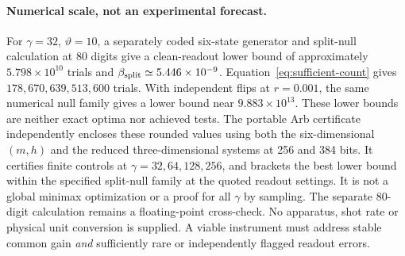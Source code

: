 \paragraph{Numerical scale, not an experimental forecast.}
For $\gamma=32$, $\vartheta=10$, a separately coded six-state generator
and split-null calculation at 80 digits give a clean-readout lower bound
of approximately $5.798\times10^{10}$ trials and
$\beta_{\rm split}\simeq5.446\times10^{-9}$. Equation~\eqref{eq:sufficient-count}
gives $178{,}670{,}639{,}513{,}600$ trials. With independent flips at
$r=0.001$, the same numerical null family gives a lower bound near
$9.883\times10^{13}$. These lower bounds are neither exact optima nor
achieved tests. The portable Arb certificate independently encloses these
rounded values using both the six-dimensional $(m,h)$ and the reduced
three-dimensional systems at 256 and 384 bits. It certifies finite controls
at $\gamma=32,64,128,256$, and brackets the best lower bound within the
specified split-null family at the quoted readout settings. It is not a
global minimax optimization or a proof for all $\gamma$ by sampling.
The separate 80-digit calculation remains a floating-point cross-check.
No apparatus, shot rate or physical unit
conversion is supplied. A viable instrument must address stable common
gain \emph{and} sufficiently rare or independently flagged readout errors.
